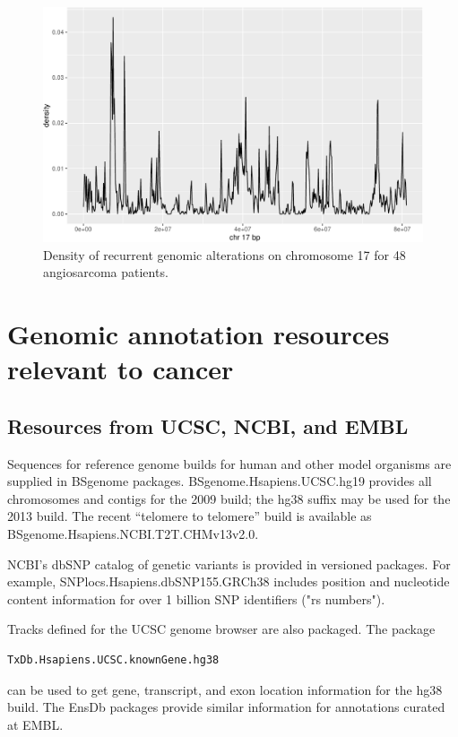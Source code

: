 \begin{figure}
\includegraphics[width=1\linewidth,]{bioccb_files/figure-latex/mkden-1} \caption{Density of recurrent genomic alterations on chromosome 17 for 48 angiosarcoma patients.}\label{fig:mkden}
\end{figure}



\section{Genomic annotation resources relevant to cancer}\label{hubs}


\subsection{Resources from UCSC, NCBI, and EMBL}\label{resources-from-ucsc-ncbi-and-embl}

Sequences for reference genome builds for human and
other model organisms are supplied in BSgenome packages.
BSgenome.Hsapiens.UCSC.hg19 provides all chromosomes and
contigs for the 2009 build; the hg38 suffix may be used
for the 2013 build. The recent ``telomere to telomere''
build is available as BSgenome.Hsapiens.NCBI.T2T.CHMv13v2.0.

NCBI's dbSNP catalog of genetic variants is provided
in versioned packages.
For example, SNPlocs.Hsapiens.dbSNP155.GRCh38 includes
position and nucleotide content information for over
1 billion SNP identifiers ("rs numbers").

Tracks defined for the UCSC genome browser are also
packaged. The package 
\begin{verbatim}
TxDb.Hsapiens.UCSC.knownGene.hg38 
\end{verbatim} 
can be
used to get gene, transcript, and exon location information
for the hg38 build. The EnsDb packages provide similar
information for annotations curated at EMBL.

